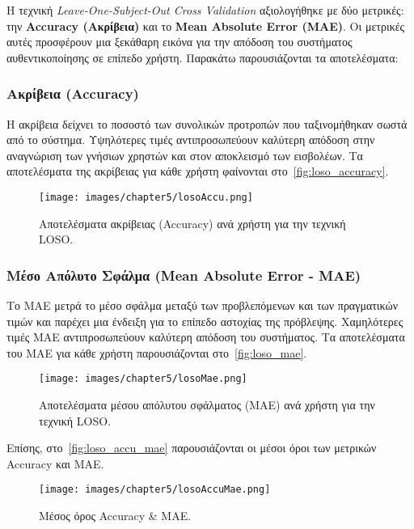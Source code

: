 Η τεχνική \textit{Leave-One-Subject-Out Cross Validation} αξιολογήθηκε με δύο μετρικές: την \textbf{Accuracy (Ακρίβεια)} και το \textbf{Mean Absolute Error (MAE)}. Οι μετρικές αυτές προσφέρουν μια ξεκάθαρη εικόνα για την απόδοση του συστήματος αυθεντικοποίησης σε επίπεδο χρήστη. Παρακάτω παρουσιάζονται τα αποτελέσματα:

\subsubsection{Ακρίβεια (Accuracy)} Η ακρίβεια δείχνει το ποσοστό των συνολικών προτροπών που ταξινομήθηκαν σωστά από το σύστημα. Υψηλότερες τιμές αντιπροσωπεύουν καλύτερη απόδοση στην αναγνώριση των γνήσιων χρηστών και στον αποκλεισμό των εισβολέων. Τα αποτελέσματα της ακρίβειας για κάθε χρήστη φαίνονται στο~\autoref{fig:loso_accuracy}.

\begin{figure}[H]
    \centering
    \texttt{[image: images/chapter5/losoAccu.png]}
    \caption{Αποτελέσματα ακρίβειας (Accuracy) ανά χρήστη για την τεχνική LOSO.}
    \label{fig:loso_accuracy}
\end{figure}

\subsubsection{Μέσο Απόλυτο Σφάλμα (Mean Absolute Error - MAE)} Το MAE μετρά το μέσο σφάλμα μεταξύ των προβλεπόμενων και των πραγματικών τιμών και παρέχει μια ένδειξη για το επίπεδο αστοχίας της πρόβλεψης. Χαμηλότερες τιμές MAE αντιπροσωπεύουν καλύτερη απόδοση του συστήματος. Τα αποτελέσματα του MAE για κάθε χρήστη παρουσιάζονται στο~\autoref{fig:loso_mae}.

\begin{figure}[H]
    \centering
    \texttt{[image: images/chapter5/losoMae.png]}
    \caption{Αποτελέσματα μέσου απόλυτου σφάλματος (MAE) ανά χρήστη για την τεχνική LOSO.}
    \label{fig:loso_mae}
\end{figure}

Επίσης, στο~\autoref{fig:loso_accu_mae} παρουσιάζονται οι μέσοι όροι των μετρικών Accuracy και ΜΑΕ. 

\begin{figure}[H]
    \centering
    \texttt{[image: images/chapter5/losoAccuMae.png]}
    \caption{Μέσος όρος Accuracy \& MAE.}
    \label{fig:loso_accu_mae}
\end{figure}

